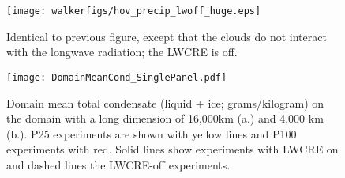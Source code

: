 \documentclass[draft]{agujournal2019}
\begin{document}
{\begin{figure}
    \texttt{[image: walkerfigs/hov\_precip\_lwoff\_huge.eps]}
  \caption{Identical to previous figure, except that the clouds do not interact with the longwave radiation; the LWCRE is off.}
  \label{fig:domdep_lwoff}
\end{figure}

\begin{figure}
  \centering
       \texttt{[image: DomainMeanCond\_SinglePanel.pdf]}
          \caption{Domain mean total condensate (liquid + ice; grams/kilogram) on the domain with a long dimension of 16,000km (a.)
          and 4,000 km (b.).  P25 experiments are shown with yellow lines and P100 experiments with red.  Solid lines show 
          experiments with LWCRE on and dashed lines the LWCRE-off experiments.}
  \label{fig:TotCond_P25P100}
\end{figure}



}
\end{document}
